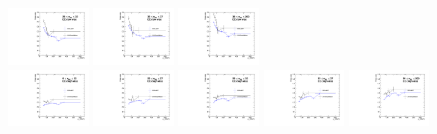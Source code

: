 \begin{figure}[!htbp]
\includegraphics[width=0.19\textwidth]{fig/compare_pv_EE1_2018_28to32.pdf}
\includegraphics[width=0.19\textwidth]{fig/compare_pv_EE1_2018_33to37.pdf}
\includegraphics[width=0.19\textwidth]{fig/compare_pv_EE1_2018_38to200.pdf}\\
\includegraphics[width=0.19\textwidth]{fig/compare_pv_EE2_2018_0to22.pdf}
\includegraphics[width=0.19\textwidth]{fig/compare_pv_EE2_2018_23to27.pdf}
\includegraphics[width=0.19\textwidth]{fig/compare_pv_EE2_2018_28to32.pdf}
\includegraphics[width=0.19\textwidth]{fig/compare_pv_EE2_2018_33to37.pdf}
\includegraphics[width=0.19\textwidth]{fig/compare_pv_EE2_2018_38to200.pdf}
\label{fig:frpileup_compare_dataset_2018}
\end{figure}


